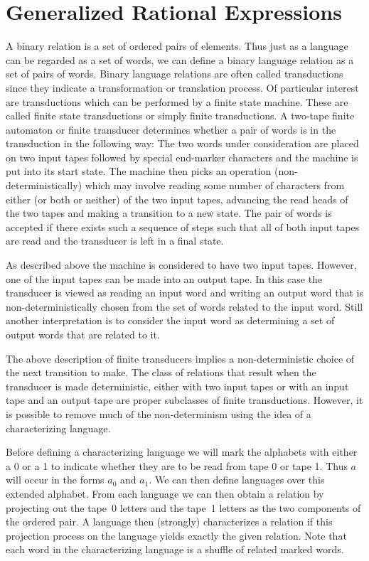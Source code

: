 \section{Generalized Rational Expressions}
A binary relation is a set of ordered pairs of elements.
Thus just as a language can be regarded as a set of words, we can define a
binary language relation as a set of pairs of words.
Binary language relations are often called transductions since they
indicate a transformation or translation process.
Of particular interest are transductions which can be performed by a finite
state machine.
These are called finite state transductions or simply finite transductions.
A two-tape finite automaton or finite transducer determines whether a pair
of words is in the transduction in the following way:
The two words under consideration are placed on two input tapes followed by
special end-marker characters and the machine is put into its start state.
The machine then picks an operation (non-deterministically) which may
involve reading some number of characters from either (or both or neither)
of the two input tapes, advancing the read heads of the two tapes and
making a transition to a new state.
The pair of words is accepted if there exists such a sequence of steps such
that all of both input tapes are read and the transducer is left in a final
state.

As described above the machine is considered to have two input tapes.
However, one of the input tapes can be made into an output tape.
In this case the transducer is viewed as reading an input word and writing
an output word that is non-deterministically chosen from the set of words
related to the input word.
Still another interpretation is to consider the input word as determining a
set of output words that are related to it.

The above description of finite transducers implies a non-deterministic choice
of the next transition to make.
The class of relations that result when the transducer is made
deterministic, either with two input tapes or with an input tape and an
output tape are proper subclasses of finite transductions.
However, it is possible to remove much of the non-determinism using the
idea of a characterizing language.

Before defining a characterizing language we will mark the alphabets with
either a 0 or a 1 to indicate whether they are to be read from tape 0 or
tape 1.
Thus $a$ will occur in the forms $a_0$ and $a_1$.
We can then define languages over this extended alphabet.
From each language we can then obtain a relation by projecting out the
tape~0 letters and the tape~1 letters as the two components of the ordered
pair.
A language then (strongly) characterizes a relation if this projection
process on the language yields exactly the given relation.
Note that each word in the characterizing language is a shuffle of related
marked words.

